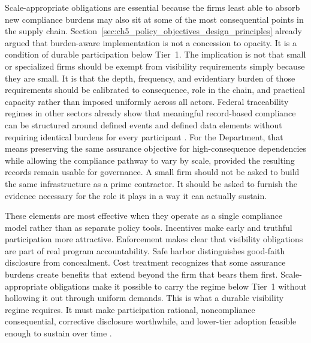 Scale-appropriate obligations are essential because the firms least able to absorb new compliance burdens may also sit at some of the most consequential points in the supply chain. Section~\ref{sec:ch5_policy_objectives_design_principles} already argued that burden-aware implementation is not a concession to opacity. It is a condition of durable participation below Tier~1. The implication is not that small or specialized firms should be exempt from visibility requirements simply because they are small. It is that the depth, frequency, and evidentiary burden of those requirements should be calibrated to consequence, role in the chain, and practical capacity rather than imposed uniformly across all actors. Federal traceability regimes in other sectors already show that meaningful record-based compliance can be structured around defined events and defined data elements without requiring identical burdens for every participant \parencite{ch5_usc2223,ch5_fda_small_entity_traceability_guide_2025}. For the Department, that means preserving the same assurance objective for high-consequence dependencies while allowing the compliance pathway to vary by scale, provided the resulting records remain usable for governance. A small firm should not be asked to build the same infrastructure as a prime contractor. It should be asked to furnish the evidence necessary for the role it plays in a way it can actually sustain.

These elements are most effective when they operate as a single compliance model rather than as separate policy tools. Incentives make early and truthful participation more attractive. Enforcement makes clear that visibility obligations are part of real program accountability. Safe harbor distinguishes good-faith disclosure from concealment. Cost treatment recognizes that some assurance burdens create benefits that extend beyond the firm that bears them first. Scale-appropriate obligations make it possible to carry the regime below Tier~1 without hollowing it out through uniform demands. This is what a durable visibility regime requires. It must make participation rational, noncompliance consequential, corrective disclosure worthwhile, and lower-tier adoption feasible enough to sustain over time \parencite{ch5_nist800161r1upd1,ch5_dod2022_supplychains,U.S.GovernmentAccountabilityOffice2025}.

